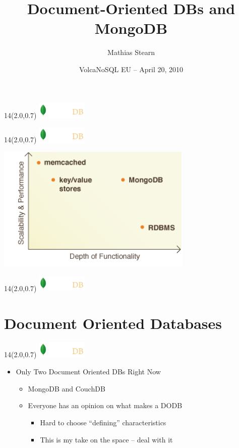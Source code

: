 \documentclass{beamer}
\title{Document-Oriented DBs and MongoDB}
\author{Mathias Stearn}
\institute{10gen}
\date{VolcaNoSQL EU -- April 20, 2010}
\newcommand{\MongoLogo}{
\begin{textblock}{14}(2.0,0.7)
  \includegraphics[height=0.8cm]{logo-mongodb-ondark.png}
\end{textblock}
}
\begin{document}
\begin{frame}
  \MongoLogo
  \titlepage
\end{frame}

\begin{frame}
  \MongoLogo
  \begin{center}
    \includegraphics[height=6cm]{featuresPerformance.png}
  \end{center}
\end{frame}

\begin{frame}
  \MongoLogo
  \tableofcontents
\end{frame}

\section{Document Oriented Databases}

\begin{frame}
  \MongoLogo
  \begin{itemize}
    \item Only Two Document Oriented DBs Right Now
    \begin{itemize}
      \item MongoDB and CouchDB
      \item Everyone has an opinion on what makes a DODB
      \begin{itemize}
        \item Hard to choose ``defining'' characteristics
        \item This is my take on the space -- deal with it
      \end{itemize}
    \end{itemize}
  \end{itemize}
\end{frame}
\end{document}
